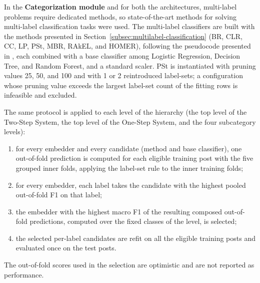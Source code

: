 In the \textbf{Categorization module} and for both the architectures, multi-label problems require dedicated methods, so state-of-the-art methods for solving multi-label classification tasks were used. The multi-label classifiers are built with the methods presented in Section~\ref{subsec:multilabel-classification} (BR, CLR, CC, LP, PSt, MBR, RAkEL, and HOMER), following the pseudocode presented in \cite{zhang2014}, each combined with a base classifier among Logistic Regression, Decision Tree, and Random Forest, and a standard scaler. PSt is instantiated with pruning values 25, 50, and 100 and with 1 or 2 reintroduced label-sets; a configuration whose pruning value exceeds the largest label-set count of the fitting rows is infeasible and excluded.

The same protocol is applied to each level of the hierarchy (the top level of the Two-Step System, the top level of the One-Step System, and the four subcategory levels):
\begin{enumerate}
    \item for every embedder and every candidate (method and base classifier), one out-of-fold prediction is computed for each eligible training post with the five grouped inner folds, applying the label-set rule to the inner training folds;
    \item for every embedder, each label takes the candidate with the highest pooled out-of-fold F1 on that label;
    \item the embedder with the highest macro F1 of the resulting composed out-of-fold predictions, computed over the fixed classes of the level, is selected;
    \item the selected per-label candidates are refit on all the eligible training posts and evaluated once on the test posts.
\end{enumerate}
The out-of-fold scores used in the selection are optimistic and are not reported as performance.

